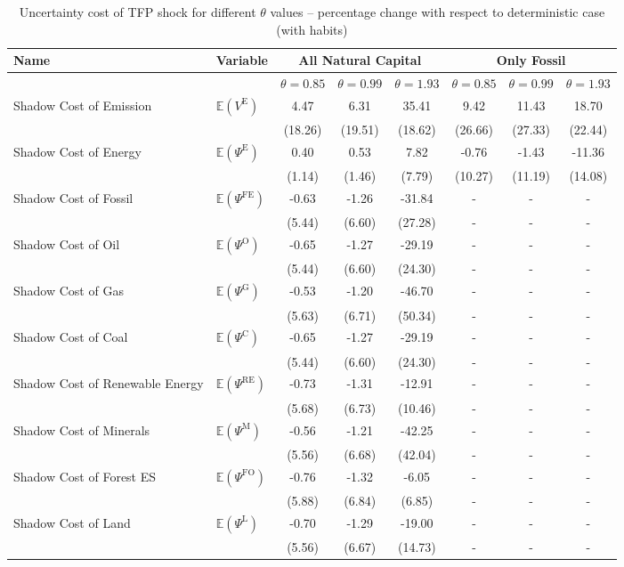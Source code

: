 \begin{table}[h!]
\centering
\begin{tabular}{l l c c c c c c}
\hline
Name & Variable & \multicolumn{3}{c}{All Natural Capital} & \multicolumn{3}{c}{Only Fossil} \\
\hline
 & & $\theta = 0.85$ & $\theta = 0.99$ & $\theta = 1.93$ & $\theta = 0.85$ & $\theta = 0.99$ & $\theta = 1.93$\\
\hline
Shadow Cost of Emission & $\mathbb{E}\!\left(V^{\text{E}}\right)$ & 4.47 & 6.31 & 35.41 & 9.42 & 11.43 & 18.70 \\
 & & (18.26) & (19.51) & (18.62) & (26.66) & (27.33) & (22.44) \\
Shadow Cost of Energy & $\mathbb{E}\!\left(\Psi^{\text{E}}\right)$ & 0.40 & 0.53 & 7.82 & -0.76 & -1.43 & -11.36 \\
 & & (1.14) & (1.46) & (7.79) & (10.27) & (11.19) & (14.08) \\
Shadow Cost of Fossil & $\mathbb{E}\!\left(\Psi^{\text{FE}}\right)$ & -0.63 & -1.26 & -31.84 & - & - & - \\
 & & (5.44) & (6.60) & (27.28) & - & - & - \\
Shadow Cost of Oil & $\mathbb{E}\!\left(\Psi^{\text{O}}\right)$ & -0.65 & -1.27 & -29.19 & - & - & - \\
 & & (5.44) & (6.60) & (24.30) & - & - & - \\
Shadow Cost of Gas & $\mathbb{E}\!\left(\Psi^{\text{G}}\right)$ & -0.53 & -1.20 & -46.70 & - & - & - \\
 & & (5.63) & (6.71) & (50.34) & - & - & - \\
Shadow Cost of Coal & $\mathbb{E}\!\left(\Psi^{\text{C}}\right)$ & -0.65 & -1.27 & -29.19 & - & - & - \\
 & & (5.44) & (6.60) & (24.30) & - & - & - \\
Shadow Cost of Renewable Energy & $\mathbb{E}\!\left(\Psi^{\text{RE}}\right)$ & -0.73 & -1.31 & -12.91 & - & - & - \\
 & & (5.68) & (6.73) & (10.46) & - & - & - \\
Shadow Cost of Minerals & $\mathbb{E}\!\left(\Psi^{\text{M}}\right)$ & -0.56 & -1.21 & -42.25 & - & - & - \\
 & & (5.56) & (6.68) & (42.04) & - & - & - \\
Shadow Cost of Forest ES & $\mathbb{E}\!\left(\Psi^{\text{FO}}\right)$ & -0.76 & -1.32 & -6.05 & - & - & - \\
 & & (5.88) & (6.84) & (6.85) & - & - & - \\
Shadow Cost of Land & $\mathbb{E}\!\left(\Psi^{\text{L}}\right)$ & -0.70 & -1.29 & -19.00 & - & - & - \\
 & & (5.56) & (6.67) & (14.73) & - & - & - \\
\hline
\end{tabular}
\caption{Uncertainty cost of TFP shock for different $\theta$ values -- percentage change with respect to deterministic case (with habits)}
\label{tab:paper_table30}
\end{table}
